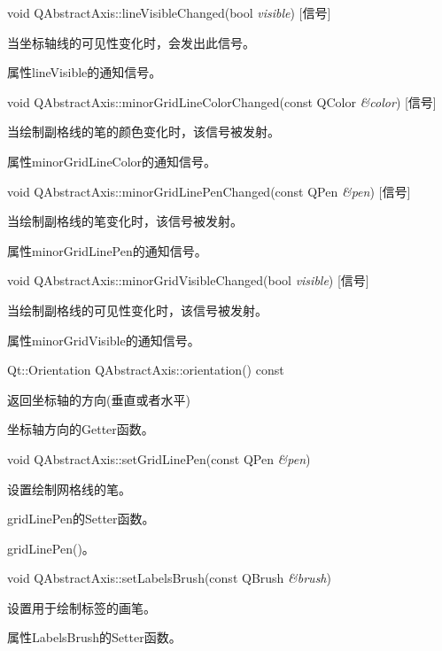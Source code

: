 void QAbstractAxis::lineVisibleChanged(bool \emph{visible}) [信号] 

当坐标轴线的可见性变化时，会发出此信号。

\begin{notice}
属性lineVisible的通知信号。
\end{notice}

void QAbstractAxis::minorGridLineColorChanged(const QColor \emph{\&color})
[信号]

 当绘制副格线的笔的颜色变化时，该信号被发射。 

\begin{notice}
属性minorGridLineColor的通知信号。
\end{notice}

void QAbstractAxis::minorGridLinePenChanged(const QPen \emph{\&pen}) [信号] 

当绘制副格线的笔变化时，该信号被发射。 

\begin{notice}
属性minorGridLinePen的通知信号。
\end{notice}

void QAbstractAxis::minorGridVisibleChanged(bool \emph{visible}) [信号] 

当绘制副格线的可见性变化时，该信号被发射。 

\begin{notice}
属性minorGridVisible的通知信号。
\end{notice}

Qt::Orientation QAbstractAxis::orientation() const 

返回坐标轴的方向(垂直或者水平) 

\begin{notice}
坐标轴方向的Getter函数。
\end{notice}

void QAbstractAxis::setGridLinePen(const QPen \emph{\&pen}) 

设置绘制网格线的笔。 

\begin{notice}
gridLinePen的Setter函数。
\end{notice}

\begin{seeAlso}
gridLinePen()。
\end{seeAlso}

void QAbstractAxis::setLabelsBrush(const QBrush \emph{\&brush})

设置用于绘制标签的画笔。 

\begin{notice}
属性LabelsBrush的Setter函数。
\end{notice}

